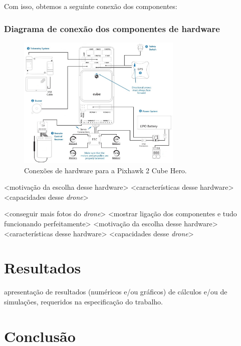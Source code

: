 \documentclass[12pt,a4paper,oneside]{book}
\begin{document}
Com isso, obtemos a seguinte conexão dos componentes:
\subsection{Diagrama de conexão dos componentes de hardware}
%
\begin{figure}[!htbp]
  \centering
  \includegraphics[width=0.7\textwidth]{Images/Diagramas/cube_wiring_overview.jpg}
  \caption{Conexões de hardware para a Pixhawk 2 Cube Hero.}
  \label{fig:cube_wiring_overview.jpg.0}
\end{figure}
%

<motivação da escolha desse hardware>
<características desse hardware>
<capacidades desse \textit{drone}>

<conseguir mais fotos do \textit{drone}>
<mostrar ligação dos componentes e tudo funcionando perfeitamente>
<motivação da escolha desse hardware>
<características desse hardware>
<capacidades desse \textit{drone}>

\newpage

\chapter{Resultados}
%
\thispagestyle{empty} 
%
apresentação de resultados (numéricos e/ou gráficos) 
de cálculos e/ou de simulações, requeridos na especificação do trabalho.




\chapter{Conclusão}
%
\thispagestyle{empty} 
%
\end{document}
